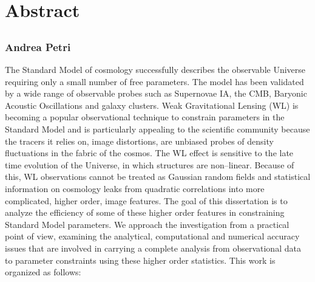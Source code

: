\chapter*{\centering Abstract}
\section*{\centering \thesistitle}
\subsection*{\centering Andrea Petri}
The Standard Model of cosmology successfully describes the observable Universe requiring only a small number of free parameters. The model has been validated by a wide range of observable probes such as Supernovae IA, the CMB, Baryonic Acoustic Oscillations and galaxy clusters. Weak Gravitational Lensing (WL) is becoming a popular observational technique to constrain parameters in the Standard Model and is particularly appealing to the scientific community because the tracers it relies on, image distortions, are unbiased probes of density fluctuations in the fabric of the cosmos. The WL effect is sensitive to the late time evolution of the Universe, in which structures are non--linear. Because of this, WL observations cannot be treated as Gaussian random fields and statistical information on cosmology leaks from quadratic correlations into more complicated, higher order, image features. The goal of this dissertation is to analyze the efficiency of some of these higher order features in constraining Standard Model parameters. We approach the investigation from a practical point of view, examining the analytical, computational and numerical accuracy issues that are involved in carrying a complete analysis from observational data to parameter constraints using these higher order statistics. This work is organized as follows:

